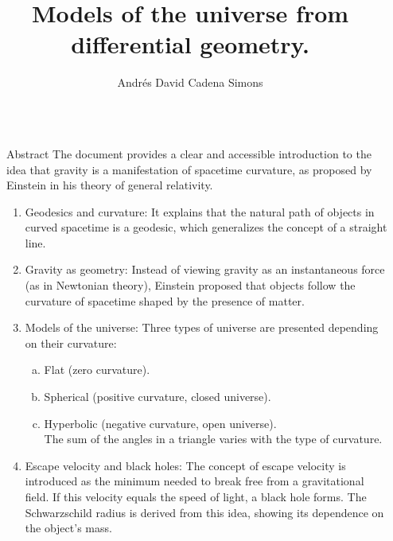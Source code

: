 \documentclass[final]{beamer}
\title{Models of the universe from differential geometry.}
\author{Andrés David Cadena Simons}
\institute[shortinst]{Departamento de Matemáticas, Universidad Nacional de Colombia sede Bogotá.}
\newlength{\sepwidth}
\newlength{\colwidth}
\newcommand{\separatorcolumn}{\begin{column}{\sepwidth}\end{column}}
\begin{document}

\begin{frame}[t]
\begin{columns}[t]
\separatorcolumn

\begin{column}{\colwidth}

  \begin{block}{Abstract}
    The document provides a clear and accessible introduction to the idea that gravity is a manifestation of spacetime curvature, as proposed by Einstein in his theory of general relativity.
    \begin{enumerate}
      \item Geodesics and curvature: It explains that the natural path of objects in curved spacetime is a geodesic, which generalizes the concept of a straight line.
      \item Gravity as geometry: Instead of viewing gravity as an instantaneous force (as in Newtonian theory), Einstein proposed that objects follow the curvature of spacetime shaped by the presence of matter.
      \item Models of the universe: Three types of universe are presented depending on their curvature:
      \begin{enumerate}[(a)]
        \item Flat (zero curvature).
        \item Spherical (positive curvature, closed universe).
        \item Hyperbolic (negative curvature, open universe).\\
          The sum of the angles in a triangle varies with the type of curvature.
      \end{enumerate}
      \item Escape velocity and black holes: The concept of escape velocity is introduced as the minimum needed to break free from a gravitational field. If this velocity equals the speed of light, a black hole forms. The Schwarzschild radius is derived from this idea, showing its dependence on the object's mass.

\end{enumerate}
\end{block}
\end{column}
\end{columns}
\end{frame}
\end{document}
